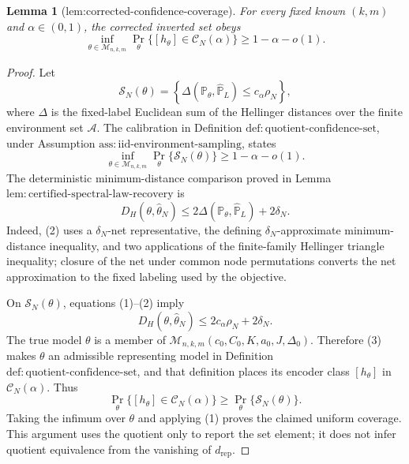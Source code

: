 \documentclass{article}
\newtheorem{lemma}{Lemma}
\begin{document}
\begin{lemma}[lem:corrected-confidence-coverage]\label{lem:corrected-confidence-coverage}
For every fixed known \((k,m)\) and \(\alpha\in(0,1)\), the corrected inverted set obeys
\[
\inf_{\theta\in\mathcal M_{n,k,m}}
\Pr_\theta\{[h_\theta]\in\mathcal C_N(\alpha)\}
\ge1-\alpha-o(1).
\]
\end{lemma}
\begin{proof}
Let
\[
 \mathcal S_N(\theta)=
 \left\{\Delta(\mathbb P_\theta,\widehat{\mathbb P}_L)
 \leq c_\alpha\rho_N\right\},
\]
where \(\Delta\) is the fixed-label Euclidean sum of the Hellinger distances over the finite environment set \(\mathcal A\).  The calibration in Definition \(\mathrm{def:quotient\text{-}confidence\text{-}set}\), under Assumption \(\mathrm{ass:iid\text{-}environment\text{-}sampling}\), states
\[
 \inf_{\theta\in\mathcal M_{n,k,m}}
 \Pr_\theta\{\mathcal S_N(\theta)\}
 \geq1-\alpha-o(1).
\tag{1}
\]
The deterministic minimum-distance comparison proved in Lemma \(\mathrm{lem:certified\text{-}spectral\text{-}law\text{-}recovery}\) is
\[
 D_H(\theta,\widehat\theta_N)
 \leq2\Delta(\mathbb P_\theta,\widehat{\mathbb P}_L)+2\delta_N.
\tag{2}
\]
Indeed, (2) uses a \(\delta_N\)-net representative, the defining \(\delta_N\)-approximate minimum-distance inequality, and two applications of the finite-family Hellinger triangle inequality; closure of the net under common node permutations converts the net approximation to the fixed labeling used by the objective.

On \(\mathcal S_N(\theta)\), equations (1)--(2) imply
\[
 D_H(\theta,\widehat\theta_N)
 \leq2c_\alpha\rho_N+2\delta_N.
\tag{3}
\]
The true model \(\theta\) is a member of \(\mathcal M_{n,k,m}(c_0,C_0,K,a_0,J,\Delta_0)\).  Therefore (3) makes \(\theta\) an admissible representing model in Definition \(\mathrm{def:quotient\text{-}confidence\text{-}set}\), and that definition places its encoder class \([h_\theta]\) in \(\mathcal C_N(\alpha)\).  Thus
\[
 \Pr_\theta\{[h_\theta]\in\mathcal C_N(\alpha)\}
 \geq\Pr_\theta\{\mathcal S_N(\theta)\}.
\]
Taking the infimum over \(\theta\) and applying (1) proves the claimed uniform coverage.  This argument uses the quotient only to report the set element; it does not infer quotient equivalence from the vanishing of \(d_{\mathrm{rep}}\).
\end{proof}
\end{document}

